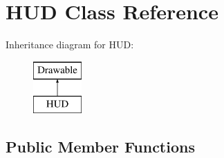 \hypertarget{class_h_u_d}{}\section{H\+U\+D Class Reference}
\label{class_h_u_d}
Inheritance diagram for H\+U\+D\+:\begin{figure}[H]
\begin{center}
\leavevmode
\includegraphics[height=2.000000cm]{class_h_u_d}
\end{center}
\end{figure}
\subsection*{Public Member Functions}
